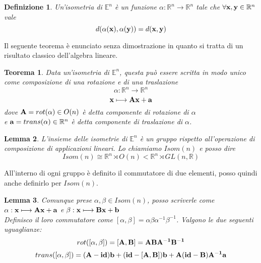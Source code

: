 \documentclass[10pt,a4paper]{article}
\newtheorem{definition}{Definizione}[section]
\newtheorem{theorem}{Teorema}[section]
\newtheorem{lemma}[theorem]{Lemma}
\begin{document}
\begin{definition}
	Un'isometria di $\mathbb{E}^n$  è un funzione $ \alpha : \mathbb{R}^{n} \longrightarrow \mathbb{R}^{n} $  tale che $\forall \vb{x,y} \in \mathbb{R}^n $ vale 
	\[ d(\alpha(\vb{x}), \alpha(\vb{y})) = d(\vb{x} , \vb{y} )\]
\end{definition} 
Il seguente teorema è enunciato senza dimostrazione in quanto si tratta di un risultato classico dell'algebra lineare. 
\begin{theorem}
Data un'isometria di $\mathbb{E}^n $, questa può essere scritta in modo unico come composizione di una rotazione e di una traslazione
\[ \alpha : \mathbb{R}^{n} \longrightarrow \mathbb{R}^{n} \]
\[\vb{x} \longmapsto \vb{Ax + a} \]
dove $\vb{A} = rot( \alpha ) \in O(n) $ è detta componente di rotazione di $\alpha$ \\
e $\vb{a} = trans( \alpha ) \in \mathbb{R}^{n} $ è detta componente di traslazione di $\alpha$. 
\end{theorem}
\begin{lemma}
L'insieme delle isometrie di  $\mathbb{E}^{n} $  è un gruppo rispetto all'operazione di composizione di applicazioni lineari. Lo chiamiamo $Isom(n)$ e posso dire
\[ Isom(n) \cong \mathbb{R}^{n} \rtimes O(n) < \mathbb{R}^{n} \rtimes GL(n, \mathbb{R})
\]
\end{lemma}
All'interno di ogni gruppo è definito il commutatore di due elementi, posso quindi anche definirlo per $Isom(n)$.
\begin{lemma}
	Comunque prese  $ \alpha , \beta \in Isom(n)$, posso scriverle come $\alpha : \vb{x} \longmapsto \vb{Ax + a}$ e $\beta : \vb{x} \longmapsto \vb{Bx + b}$ \\
	Definisco il loro commutatore come  $ [ \alpha , \beta] = \alpha \beta \alpha^{-1} \beta^{-1}$. 
Valgono le due seguenti uguaglianze:
\begin{equation}
rot([ \alpha	, \beta ]) = \vb{[A, B]} = \vb{ABA^{-1}B^{-1}}
\end{equation}  
\begin{equation}
trans([ \alpha	, \beta ]) = \vb{(A-id)b+(id-[A,B])b+A(id-B)A^{-1}a }
\end{equation} 
\end{lemma}
\end{document}
